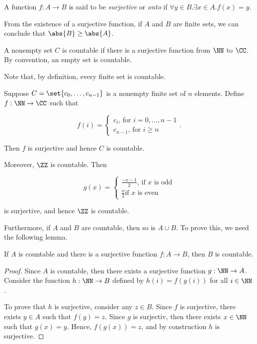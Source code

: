 \documentclass[11pt]{scrartcl}
\begin{document}
\begin{definition}
  A function $f: A\to B$ is said to be \textit{surjective} or \textit{onto} if $\forall y\in B.\exists x\in A.f(x) = y$. 
\end{definition}

From the existence of a surjective function, if $A$ and $B$ are finite sets, we can conclude that $\abs{B}\geq \abs{A}$.
\begin{definition}
A nonempty set $C$ is countable if there is a surjective function from $\NN$ to $\CC$. By convention, an empty set is countable.
\end{definition}

Note that, by definition, every finite set is countable.

Suppose $C = \set{c_0, \dots, c_{n-1}}$ is a nonempty finite set of $n$ elements. Define $f:\NN\to \CC$ such that

\begin{equation}
  f(i)=\begin{cases}
    c_i \text{, for $i = 0,\dots, n-1$}\\
    c_{n-1} \text{, for $i\geq n$}
   \end{cases}.
 \end{equation}

 Then $f$ is surjective and hence $C$ is countable.

 Moreover, $\ZZ$ is countable. Then

 \begin{equation}
   g(x) = \begin{cases}
     \frac{-x-1}{2} \text{, if $x$ is odd}\\
     \frac{x}{2} \text{if $x$ is even}
   \end{cases}
 \end{equation}

 is surjective, and hence $\ZZ$ is countable.

 Furthermore, if $A$ and $B$ are countable, then so is $A\cup B$. To prove this, we need the following lemma.

 \begin{lemma}
   If $A$ is countable and there is a surjective function $f: A\to B$,
   then $B$ is countable.
 \end{lemma}

 \begin{proof}
   \hfill
   Since $A$ is countable, then there exists a surjective function $g:\NN \to A$. Consider the function $h:\NN \to B$ defined by $h(i) = f(g(i))$ for all $i\in\NN$.

   To prove that $h$ is surjective, consider any $z\in B$. Since $f$
   is surjective, there exists $y\in A$ such that $f(y) = z$. Since
   $g$ is surjectiv, then there exists $x\in\NN$ such that $g(x) =
   y$. Hence, $f(g(x)) = z$, and by construction $h$ is surjective.
 \end{proof}
\end{document}
